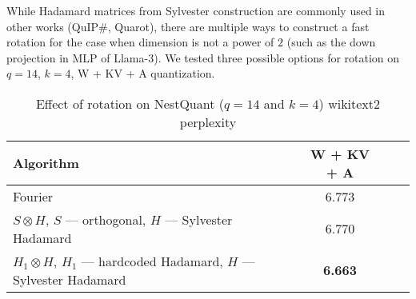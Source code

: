 While Hadamard matrices from Sylvester construction are commonly used in other works (QuIP\#, Quarot), there are multiple ways to construct a fast rotation for the case when dimension is not a power of $2$ (such as the down projection in MLP of Llama-3). We tested three possible options for rotation on $q = 14$, $k = 4$, W + KV + A quantization.

\begin{table}[h]
\centering
\scriptsize
\begin{tabular}{lccc}
    \toprule
Algorithm &
\textbf{W + KV + A}\\    \midrule
    Fourier & 6.773\\
    $S \otimes H$, $S$ --- orthogonal, $H$ --- Sylvester Hadamard & 6.770 \\
    $H_1 \otimes H$, $H_1$ --- hardcoded Hadamard, $H$ --- Sylvester Hadamard & \textbf{6.663} \\
    \bottomrule
\end{tabular}
\ifisicml\else\vspace{1em}\fi
\caption{Effect of rotation on NestQuant ($q=14$ and $k=4$) wikitext2 perplexity} 
\label{tab:rot_ppl}
\end{table}
